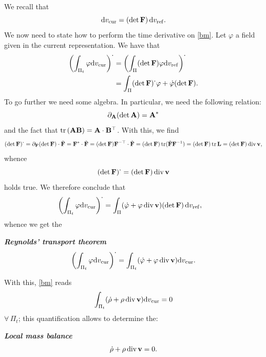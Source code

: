 We recall that
\begin{equation}
	\mathrm{d} v_{\rm cur}=(\det\mathbf{F})\,\mathrm{d} v_{\rm ref}.
\end{equation}
We now need to state how to perform the time derivative on \eqref{bm}. Let $\varphi$ a  field given in the current representation. We have that
\begin{equation}
	\begin{aligned}
		\left( \int_{\Pi_t}  \varphi\mathrm{d} v_{\rm cur}\right)^{\operatorname{{\boldsymbol{\cdot}}}}&=\left( \int_{\Pi}(\det\mathbf{F})\varphi  \mathrm{d} v_{\rm ref} \right)^{\operatorname{{\boldsymbol{\cdot}}}}\\
		&=\int_{\Pi}(\det\mathbf{F})^{\operatorname{{\boldsymbol{\cdot}}}}\varphi+\dot{\varphi}(\det\mathbf{F}).
	\end{aligned}
\end{equation}
To go further we need some algebra. In particular, we need the following relation:
\begin{equation}\label{devdet}
	\partial_{\mathbf{A}}(\det\mathbf{A})=\mathbf{A}^*
\end{equation}
and  the fact that $\operatorname{tr}{(\mathbf{A}\mathbf{B})}=\mathbf{A}\cdot\mathbf{B}^\top$. With this, we find 
\begin{equation}
	(\det\mathbf{F})^{\operatorname{{\boldsymbol{\cdot}}}}=\partial_{\mathbf{F}}(\det\mathbf{F})\cdot\dot{\mathbf{F}}=\mathbf{F}^*\cdot\dot{\mathbf{F}}=(\det\mathbf{F})\mathbf{F}^{-\top}\cdot\dot{\mathbf{F}}=(\det\mathbf{F})\operatorname{tr}(\dot{\mathbf{F}}\mathbf{F}^{-1})=(\det\mathbf{F})\operatorname{tr}\mathbf{L}=(\det\mathbf{F})\operatorname{div}\mathbf{v},
\end{equation}
whence 
\begin{equation}
	(\det\mathbf{F})^{\operatorname{{\boldsymbol{\cdot}}}}=(\det\mathbf{F})\operatorname{div} \mathbf{v}
\end{equation}
holds true. We therefore  conclude that
\begin{equation}
	\begin{aligned}
		\left( \int_{\Pi_t}  \varphi\mathrm{d} v_{\rm cur}\right)^{\operatorname{{\boldsymbol{\cdot}}}}&=\int_{\Pi}(\dot{\varphi}+\varphi\operatorname{div}\mathbf{v})(\det\mathbf{F})\,\mathrm{d} v_{\rm ref},
	\end{aligned}
\end{equation}
whence we get the 
\begin{definition}
\textit{\textbf{Reynolds' transport theorem}}
\begin{equation}\label{reyn}
	\begin{aligned}
		\left( \int_{\Pi_t}  \varphi\mathrm{d} v_{\rm cur}\right)^{\operatorname{{\boldsymbol{\cdot}}}}=\int_{\Pi_t}(\dot{\varphi}+\varphi\operatorname{div}\mathbf{v})\mathrm{d} v_{\rm cur}.
	\end{aligned}
\end{equation}
\end{definition}
With this, \eqref{bm} reads
\begin{equation}
	\int_{\Pi_t}(\dot{\rho}+\rho\operatorname{div}\mathbf{v})\mathrm{d} v_{\rm cur}=0
\end{equation}
$\forall\,\Pi_t$; this quantification allows to determine the:
\begin{definition}
 \textit{\textbf{Local mass balance}}
\begin{equation}\label{masbal}
	\dot{\rho}+\rho\operatorname{div}\mathbf{v}=0.
\end{equation}
\end{definition}

